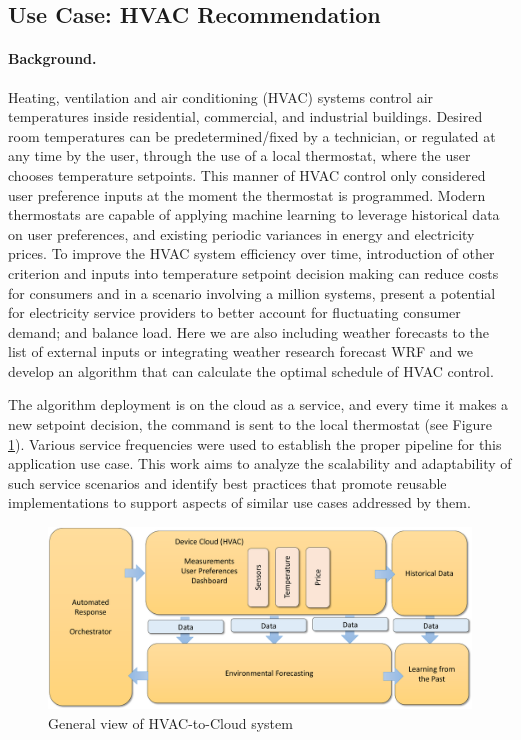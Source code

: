 \subsection{Use Case: HVAC Recommendation}

\paragraph*{Background.}
Heating, ventilation and air conditioning (HVAC) systems control air temperatures inside residential, commercial, and industrial  buildings. 
Desired room temperatures can be predetermined/fixed by a technician, or regulated at any time by the user, through the use of a local thermostat, where the user chooses temperature setpoints. This manner of  HVAC control only considered user preference inputs at the moment the thermostat is programmed. Modern thermostats are capable of applying machine learning to leverage historical data on user preferences, and existing periodic variances in energy and  electricity prices. To improve the HVAC system efficiency over time, introduction of other criterion and inputs into temperature setpoint decision making can reduce costs for consumers and in a scenario involving a million systems, present a potential for electricity service providers to better account for fluctuating consumer demand; and balance load. Here we are also including weather forecasts to the list of external inputs or integrating weather research forecast WRF and we develop an algorithm that can calculate the optimal schedule of HVAC control. 

The algorithm deployment is on the cloud as a service, and every time it makes a new setpoint decision, the command is sent to the local thermostat (see Figure \ref{fig:hvac_general}). Various service frequencies were used to establish the proper pipeline for this application use case. This work aims to analyze the scalability and adaptability of such service scenarios and identify best practices that promote reusable implementations to support aspects of similar use cases addressed by them.

\begin{figure}[htb]
\centering\includegraphics[width=1.0\columnwidth]{usecase/images/nist-hvac-layer.pdf}
\caption{General view of HVAC-to-Cloud system}
\label{fig:hvac_general}
\end{figure}


